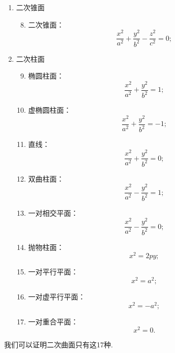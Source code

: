 \begin{enumerate}[label={\chinese*.}]
	\item 二次锥面
	\begin{enumerate}[label={\arabic*.}]
		\setcounter{enumii}{7}
		\item 二次锥面：\begin{equation*}
			\frac{x^2}{a^2}+\frac{y^2}{b^2}-\frac{z^2}{c^2}=0;
		\end{equation*}
	\end{enumerate}

	\item 二次柱面
	\begin{enumerate}[label={\arabic*.}]
		\setcounter{enumii}{8}
		\item 椭圆柱面：\begin{equation*}
			\frac{x^2}{a^2}+\frac{y^2}{b^2}=1;
		\end{equation*}

		\item 虚椭圆柱面：\begin{equation*}
			\frac{x^2}{a^2}+\frac{y^2}{b^2}=-1;
		\end{equation*}

		\item 直线：\begin{equation*}
			\frac{x^2}{a^2}+\frac{y^2}{b^2}=0;
		\end{equation*}

		\item 双曲柱面：\begin{equation*}
			\frac{x^2}{a^2}-\frac{y^2}{b^2}=1;
		\end{equation*}

		\item 一对相交平面：\begin{equation*}
			\frac{x^2}{a^2}-\frac{y^2}{b^2}=0;
		\end{equation*}

		\item 抛物柱面：\begin{equation*}
			x^2=2py;
		\end{equation*}

		\item 一对平行平面：\begin{equation*}
			x^2=a^2;
		\end{equation*}

		\item 一对虚平行平面：\begin{equation*}
			x^2=-a^2;
		\end{equation*}

		\item 一对重合平面：\begin{equation*}
			x^2=0.
		\end{equation*}
	\end{enumerate}
\end{enumerate}
我们可以证明二次曲面只有这17种.

